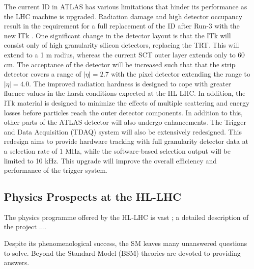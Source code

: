 The current ID in ATLAS has various limitations that hinder its performance as the \ac{LHC} machine is upgraded. Radiation damage and high detector occupancy result in the requirement for a full replacement of the ID after Run-3 with the new ITk \cite{pileup,itk-strip}. One significant change in the detector layout is that the ITk will consist only of high granularity silicon detectors, replacing the TRT. This will extend to a 1 m radius, whereas the current SCT outer layer extends only to 60 cm. The acceptance of the detector will be increased such that that the strip detector covers a range of $ \lvert \eta \rvert = 2.7$ with the pixel detector extending the range to $ \lvert \eta \rvert = 4.0$. The improved radiation hardness is designed to cope with greater fluence values in the harsh conditions expected at the HL-LHC. In addition, the ITk material is designed to minimize the effects of multiple scattering and energy losses before particles reach the outer detector components. In addition to this, other parts of the ATLAS detector will also undergo enhancements. The Trigger and Data Acquisition (TDAQ) system will also be extensively redesigned. This redesign aims to provide hardware tracking with full granularity detector data at a selection rate of 1 MHz, while the software-based selection output will be limited to 10 kHz. This upgrade will improve the overall efficiency and performance of the trigger system.


\subsection{Physics Prospects at the HL-LHC}
The physics programme offered by the HL-LHC is vast \cite{big-report}; a detailed description of the project ....




Despite its phenomenological success, the SM leaves many unanswered questions to solve. Beyond the Standard Model (BSM) theories are devoted to providing answers.


